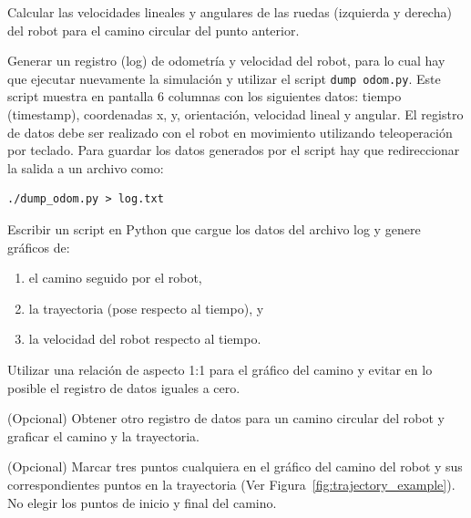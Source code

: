 \documentclass[tp]{lcc}
\begin{document}
\ejercicio  Calcular las velocidades lineales y angulares de las ruedas (izquierda y derecha) del robot para el camino circular del punto anterior.

\ejercicio Generar un registro (log) de odometría y velocidad del robot, para lo cual hay que ejecutar nuevamente la simulación y utilizar el script \lstinline[style=bash]{dump odom.py}. Este script muestra en pantalla 6 columnas con los siguientes datos: tiempo (timestamp), coordenadas x, y, orientación, velocidad lineal y angular. El registro de datos debe ser realizado con el robot en movimiento utilizando teleoperación por teclado. Para guardar los datos generados por el script hay que redireccionar la salida a un archivo como:

\begin{lstlisting}[style=bash] 
./dump_odom.py > log.txt
\end{lstlisting}

\ejercicio Escribir un script en Python que cargue los datos del archivo log y genere gráficos de:
\begin{enumerate}
	\item el camino seguido por el robot,
	\item la trayectoria (pose respecto al tiempo), y
	\item la velocidad del robot respecto al tiempo.
\end{enumerate} 

\begin{nota}
	Utilizar una relación de aspecto 1:1 para el gráfico del camino y evitar en lo posible el registro de datos iguales a cero.
\end{nota}

\ejercicio (Opcional) Obtener otro registro de datos para un camino circular del robot y graficar el camino y la trayectoria.

\ejercicio (Opcional) Marcar tres puntos cualquiera en el gráfico del camino del robot y sus correspondientes puntos en la trayectoria (Ver Figura~\ref{fig:trajectory_example}). No elegir los puntos de inicio y final del camino.
\end{document}
